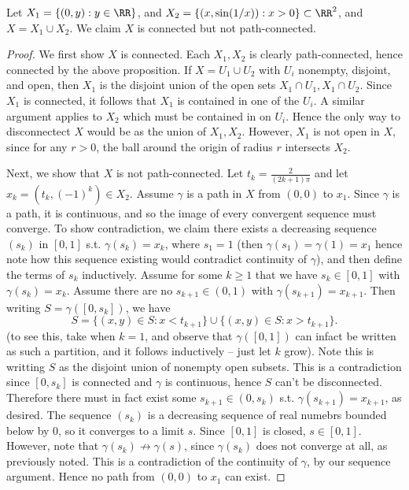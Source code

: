 \begin{example}
  Let $X_1=\{(0,y): y\in\RR\}$, and $X_2=\{(x,\sin(1/x)): x>0\}\subset\RR^2$,
  and $X=X_1\cup X_2$.  We claim $X$ is connected but not path-connected.
\end{example}
\begin{proof}
  We first show $X$ is connected. Each $X_1, X_2$ is clearly path-connected,
  hence connected by the above proposition. If $X=U_1\cup U_2$ with $U_i$
  nonempty, disjoint, and open, then $X_1$ is the disjoint union of the open
  sets $X_1\cap U_1, X_1\cap U_2$. Since $X_1$ is connected, it follows that
  $X_1$ is contained in one of the $U_i$. A similar argument applies to $X_2$
  which must be contained in on $U_i$. Hence the only way to disconnectect $X$
  would be as the union of $X_1, X_2$. However, $X_1$ is not open in $X$, since
  for any $r>0$, the ball around the origin of radius $r$ intersects $X_2$.

  Next, we show that $X$ is not path-connected. Let $t_k=\frac{2}{(2k+1)\pi}$
  and let $x_k=(t_k, (-1)^k)\in X_2$. Assume $\gamma$ is a path in $X$ from
  $(0,0)$ to $x_1$. Since $\gamma$ is a path, it is continuous, and so the image
  of every convergent sequence must converge. To show contradiction, we claim
  there exists a decreasing sequence $(s_k)$ in $[0,1]$ s.t. $\gamma(s_k)=x_k$,
  where $s_1=1$ (then $\gamma(s_1)=\gamma(1)=x_1$ hence note how this sequence
  existing would contradict continuity of $\gamma$), and then define the terms
  of $s_k$ inductively. Assume for some $k\geq 1$ that we have $s_k\in [0,1]$
  with $\gamma(s_k)=x_k$. Assume there are no $s_{k+1}\in (0,1)$ with
  $\gamma(s_{k+1})=x_{k+1}$. Then writing $S=\gamma([0,s_k])$, we have 
  \[S= \{(x,y)\in S: x<t_{k+1}\}\cup \{(x,y)\in S: x> t_{k+1}\}.\]
  (to see this, take when $k=1$, and observe that $\gamma([0,1])$ can infact be
  written as such a partition, and it follows inductively -- just let $k$ grow).
  Note this is writting $S$ as the disjoint union of nonempty open subsets. This
  is a contradiction since $[0,s_k]$ is connected and $\gamma$ is continuous,
  hence $S$ can't be disconnected. Therefore there must in fact exist some
  $s_{k+1}\in (0, s_k)$ s.t. $\gamma(s_{k+1})=x_{k+1}$, as desired. 
  The sequence $(s_k)$ is a decreasing sequence of real numebrs bounded below by
  $0$, so it converges to a limit $s$. Since $[0,1]$ is closed, $s\in [0,1]$.
  However, note that $\gamma(s_k)\not\to\gamma(s)$, since $\gamma(s_k)$ does not
  converge at all, as previously noted. This is a contradiction of the
  continuity of $\gamma$, by our sequence argument. Hence no path from
  $(0,0)$ to $x_1$ can exist.
\end{proof}

